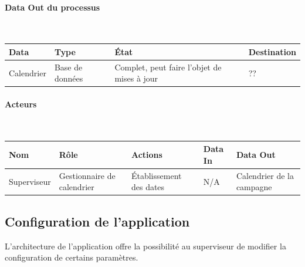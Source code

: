 \documentclass[a4paper,11pt]{report}
\begin{document}

\paragraph{Data Out du processus}~\newline{}

\begin{tabularx}{\linewidth}{|X|X|X|X|} \hline
Data & Type & État & Destination \\ \hline
Calendrier & Base de données & Complet, peut faire l'objet de mises à jour & ?? \\ \hline
\end{tabularx}

\paragraph{Acteurs}~\newline{}

\begin{tabularx}{\linewidth}{|X|X|X|X|X|} \hline
Nom & Rôle & Actions & Data In & Data Out \\ \hline
Superviseur & Gestionnaire de calendrier & Établissement des dates & N/A & Calendrier de la campagne \\ \hline
\end{tabularx}







\subsection{Configuration de l'application}
L'architecture de l'application offre la possibilité au superviseur de modifier la configuration de certains paramètres.
\end{document}
